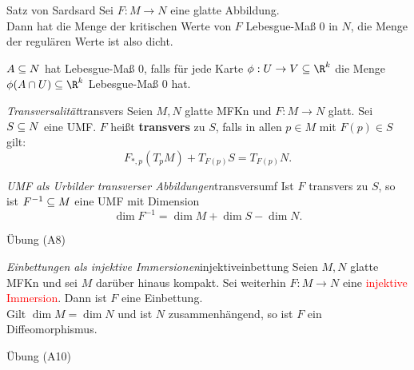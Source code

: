 \begin{satz}{Satz von Sard}{sard}
Sei $F: M \to N$ eine glatte Abbildung.\\
Dann hat die Menge der kritischen Werte von $F$ Lebesgue-Maß $0$ in $N$, die Menge der regulären Werte ist also dicht.
\end{satz}
\begin{bemerkung}
$A \subseteq N$ hat Lebesgue-Maß $0$, falls für jede Karte $\phi: U \to V \sub \R^k$ die Menge $\phi(A \cap U) \sub \R^k$ Lebesgue-Maß $0$ hat.
\end{bemerkung}
\begin{definition}{\textit{Transversalität}}{transvers}
Seien $M,N$ glatte MFKn und $F: M \to N$ glatt. Sei $S \subseteq N$ eine UMF. $F$ heißt \textbf{transvers} zu $S$, falls in allen $p \in M$ mit $F(p) \in S$ gilt:
\begin{equation}
F_{\ast, p} (T_pM) + T_{F(p)}S=T_{F(p)}N.
\end{equation}
\end{definition}
\begin{satz}{\textit{UMF als Urbilder transverser Abbildungen}}{transversumf}
Ist $F$ transvers zu $S$, so ist $F^{-1} \subseteq M$ eine UMF mit Dimension
\begin{equation}
\dim F^{-1} = \dim M + \dim S - \dim N.
\end{equation}
\end{satz}
\begin{beweis}
Übung (A8)
\end{beweis}
\begin{satz}{\textit{Einbettungen als injektive Immersionen}}{injektiveinbettung}
Seien $M,N$ glatte MFKn und sei $M$ darüber hinaus kompakt. Sei weiterhin $F: M \to N$ eine \textcolor{red}{injektive Immersion}. Dann ist $F$ eine Einbettung.\\
Gilt $\dim M = \dim N$ und ist $N$ zusammenhängend, so ist $F$ ein Diffeomorphismus.
\end{satz}
\begin{beweis}
Übung (A10)
\end{beweis}
